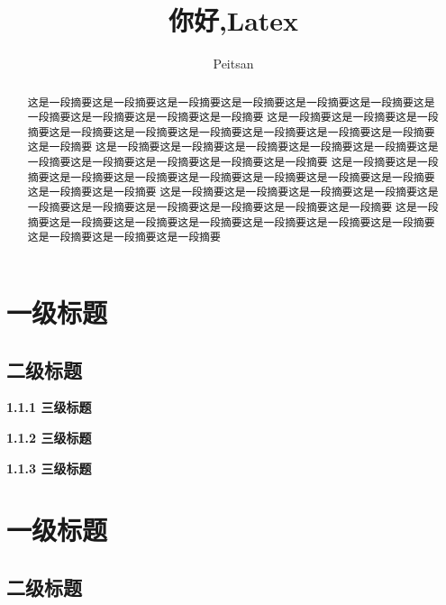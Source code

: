 \documentclass[]{article}
\title{你好,Latex}
\author{Peitsan}
\begin{document}
\maketitle

\begin{abstract}%
		
	这是一段摘要这是一段摘要这是一段摘要这是一段摘要这是一段摘要这是一段摘要这是一段摘要这是一段摘要这是一段摘要这是一段摘要	这是一段摘要这是一段摘要这是一段摘要这是一段摘要这是一段摘要这是一段摘要这是一段摘要这是一段摘要这是一段摘要这是一段摘要	这是一段摘要这是一段摘要这是一段摘要这是一段摘要这是一段摘要这是一段摘要这是一段摘要这是一段摘要这是一段摘要这是一段摘要	这是一段摘要这是一段摘要这是一段摘要这是一段摘要这是一段摘要这是一段摘要这是一段摘要这是一段摘要这是一段摘要这是一段摘要	这是一段摘要这是一段摘要这是一段摘要这是一段摘要这是一段摘要这是一段摘要这是一段摘要这是一段摘要这是一段摘要这是一段摘要	这是一段摘要这是一段摘要这是一段摘要这是一段摘要这是一段摘要这是一段摘要这是一段摘要这是一段摘要这是一段摘要这是一段摘要
\end{abstract}

\newpage

 \tableofcontents
 
\newpage
\section{一级标题}
\subsection{二级标题}
\noindent \textbf{1.1.1 三级标题}


\noindent \textbf{1.1.2 三级标题}


\noindent \textbf{1.1.3 三级标题}


\newpage
\section{一级标题}
\subsection{二级标题}
\end{document}
